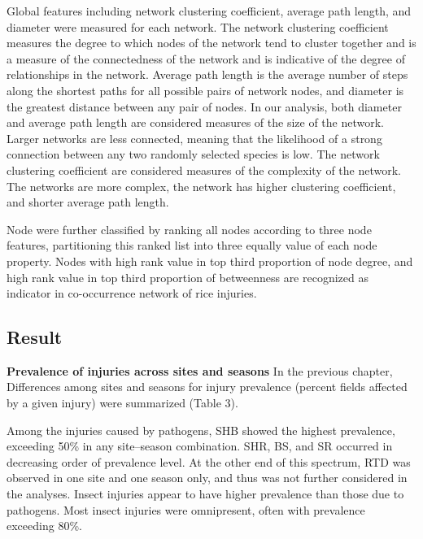 Global features including network clustering coefficient, average path length, and diameter were measured for each network. The network clustering coefficient measures the degree to which nodes of the network tend to cluster together and is a measure of the connectedness of the network and is indicative of the degree of relationships in the network. Average path length is the average number of steps along the shortest paths for all possible pairs of network nodes, and diameter is the greatest distance between any pair of nodes. In our analysis, both diameter and average path length are considered measures of the size of the network. Larger networks are less connected, meaning that the likelihood of a strong connection between any two randomly selected species is low.
The network clustering coefficient are considered measures of the complexity of the network. The networks are more complex, the network has higher clustering coefficient, and shorter average path length.

Node were further classified by ranking all nodes according to three node features, partitioning this ranked list into three equally value of each node property. Nodes with high rank value in top third proportion of node degree, and high rank value in top third proportion of betweenness are recognized as indicator in co-occurrence network of rice injuries. 

\subsection{Result}

\textbf{Prevalence of injuries across sites and seasons}
In the previous chapter, 
Differences among sites and seasons for injury prevalence (percent fields affected by a given injury) were summarized (Table 3).

 Among the injuries caused by pathogens, SHB showed the highest prevalence, exceeding 50\% in any site–season combination. SHR, BS, and SR occurred in decreasing order of prevalence level. At the other end of this spectrum, RTD was observed in one site and one season only, and thus was not further considered in the analyses. Insect injuries appear to have higher prevalence than those due to pathogens. Most insect injuries were omnipresent, often with prevalence exceeding 80\%.

